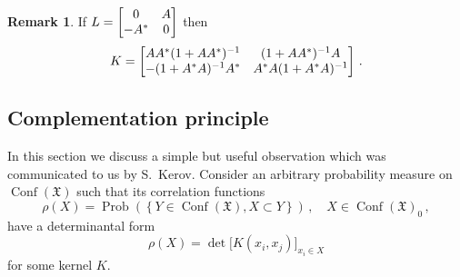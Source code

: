 \documentclass[12pt]{amsart}
\newcommand{\Prob}{\operatorname{Prob}}
\newcommand{\Conf}{\operatorname{Conf}}
\newcommand{\CX}{\Conf(\X)}
\newcommand{\CXf}{\CX_0}
\newcommand{\X}{\mathfrak{X}}
\theoremstyle{plain}
\theoremstyle{definition}
\newtheorem{remark}[lemma]{Remark}
\numberwithin{equation}{section}
\begin{document}
\begin{remark} If $L=\bmatrix 0 & A\\ -A^* & 0\endbmatrix$ then 
%
\begin{equation*}
K=\bmatrix AA^*(1+AA^*)^{-1} & (1+AA^*)^{-1}A\\
-(1+A^*A)^{-1}A^* & A^*A(1+A^*A)^{-1}\endbmatrix\,.
\end{equation*}
%
\end{remark}

\subsection{Complementation principle}\label{sA3}

In this section we discuss a simple but useful observation
which was communicated to us by S.~Kerov. 
Consider an arbitrary probability measure on $\CX$ such that
its correlation functions
$$
\rho(X)=\Prob\left(\left\{Y\in\CX, X\subset Y\right\}\right)\,, \quad X\in\CXf\,,
$$
have a determinantal form
$$
\rho(X)=\det\Big[K(x_i,x_j)\Big]_{x_i\in X}
$$
for some kernel $K$. 
\end{document}
